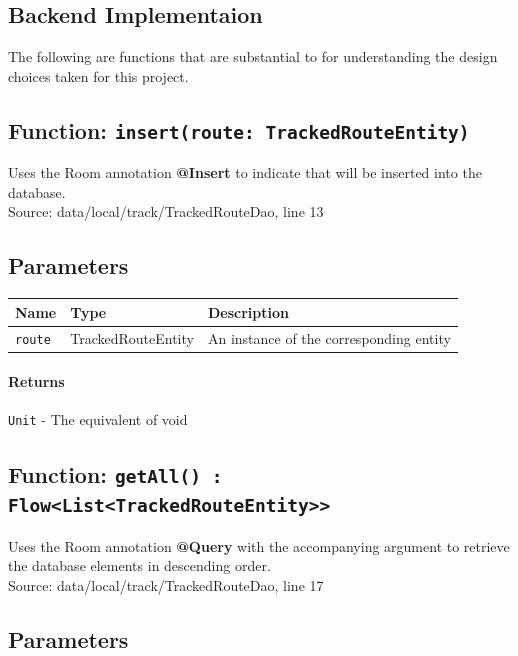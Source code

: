 \documentclass{article}
\begin{document}
        \subsection{Backend Implementaion} The following are functions that are substantial to
        for understanding the design choices taken for this project.

            \subsection*{Function: \texttt{insert(route: TrackedRouteEntity)}}

                Uses the Room annotation \textbf{@Insert} to indicate that will be inserted into
                the database.\\
                Source: data/local/track/TrackedRouteDao, line 13
                
                \subsection*{Parameters}

                \begin{tabular}{p{3cm} p{4cm} p{7cm}}
                \toprule
                \textbf{Name} & \textbf{Type} & \textbf{Description} \\ \midrule
                \texttt{route} & TrackedRouteEntity & An instance of the corresponding entity 
                \end{tabular}

                \paragraph{Returns} \texttt{Unit} - The equivalent of void

            \hrulefill

            \subsection*{Function: \texttt{getAll() : Flow<List<TrackedRouteEntity>>}}

                Uses the Room annotation \textbf{@Query} with the accompanying argument to retrieve the database elements
                in descending order. \\
                Source: data/local/track/TrackedRouteDao, line 17
                
                \subsection*{Parameters}
\end{document}
